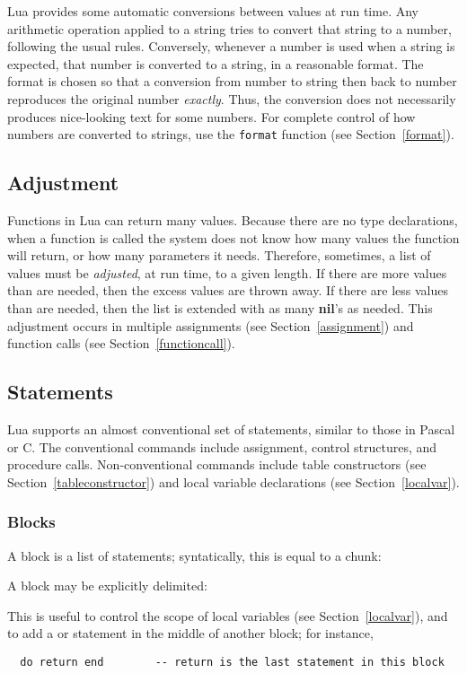 \documentclass[11pt]{article}
\newcommand{\See}[1]{Section~\ref{#1}}
\newcommand{\see}[1]{(see \See{#1})}
\newcommand{\nil}{{\bf nil}}
\newcommand{\Index}[1]{#1\index{#1}}
\begin{document}
Lua provides some automatic conversions between values at run time.
Any arithmetic operation applied to a string tries to convert
that string to a number, following the usual rules.
Conversely, whenever a number is used when a string is expected,
that number is converted to a string, in a reasonable format.
The format is chosen so that
a conversion from number to string then back to number
reproduces the original number \emph{exactly}.
Thus,
the conversion does not necessarily produces nice-looking text for some numbers.
For complete control of how numbers are converted to strings,
use the \verb|format| function \see{format}.


\subsection{\Index{Adjustment}} \label{adjust}

Functions in Lua can return many values.
Because there are no type declarations,
when a function is called
the system does not know how many values the function will return,
or how many parameters it needs.
Therefore, sometimes, a list of values must be \emph{adjusted}, at run time,
to a given length.
If there are more values than are needed,
then the excess values are thrown away.
If there are less values than are needed,
then the list is extended with as many  \nil's as needed.
This adjustment occurs in multiple assignments \see{assignment}
and function calls \see{functioncall}.


\subsection{Statements}\label{stats}

Lua supports an almost conventional set of \Index{statements},
similar to those in Pascal or C.
The conventional commands include
assignment, control structures, and procedure calls.
Non-conventional commands include table constructors
\see{tableconstructor}
and local variable declarations \see{localvar}.

\subsubsection{Blocks}
A \Index{block} is a list of statements;
syntatically, this is equal to a chunk:
\begin{Produc}
\end{Produc}%

A block may be explicitly delimited:
\begin{Produc}
\end{Produc}%
This is useful to control the scope of local variables \see{localvar},
and to add a  or  statement in the middle
of another block; for instance,
\begin{verbatim}
  do return end        -- return is the last statement in this block
\end{verbatim}
\end{document}
